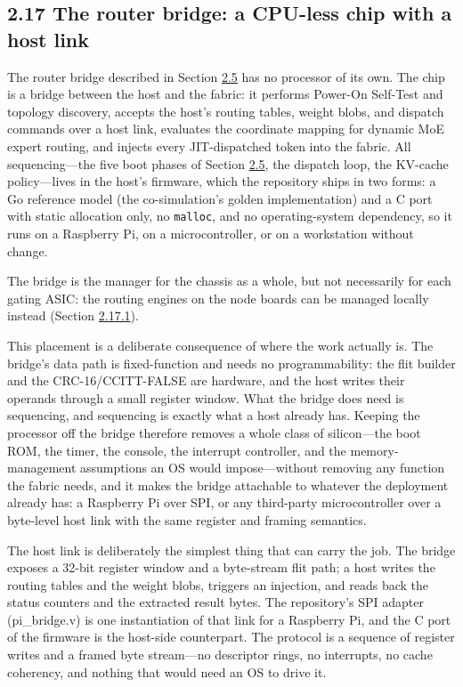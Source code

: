 \documentclass[10pt,twocolumn]{article}
\begin{document}
\subsection*{2.17 The router bridge: a CPU-less chip with a host link}\label{sec:2.17}

The router bridge described in Section \hyperref[sec:2.5]{2.5} has no processor of its own. The chip is a bridge between the host and the fabric: it performs Power-On Self-Test and topology discovery, accepts the host's routing tables, weight blobs, and dispatch commands over a host link, evaluates the coordinate mapping for dynamic MoE expert routing, and injects every JIT-dispatched token into the fabric. All sequencing---the five boot phases of Section \hyperref[sec:2.5]{2.5}, the dispatch loop, the KV-cache policy---lives in the host's firmware, which the repository ships in two forms: a Go reference model (the co-simulation's golden implementation) and a C port with static allocation only, no \texttt{malloc}, and no operating-system dependency, so it runs on a Raspberry Pi, on a microcontroller, or on a workstation without change.

The bridge is the manager for the chassis as a whole, but not necessarily for each gating ASIC: the routing engines on the node boards can be managed locally instead (Section \hyperref[sec:2.17.1]{2.17.1}).

This placement is a deliberate consequence of where the work actually is. The bridge's data path is fixed-function and needs no programmability: the flit builder and the CRC-16/CCITT-FALSE are hardware, and the host writes their operands through a small register window. What the bridge does need is sequencing, and sequencing is exactly what a host already has. Keeping the processor off the bridge therefore removes a whole class of silicon---the boot ROM, the timer, the console, the interrupt controller, and the memory-management assumptions an OS would impose---without removing any function the fabric needs, and it makes the bridge attachable to whatever the deployment already has: a Raspberry Pi over SPI, or any third-party microcontroller over a byte-level host link with the same register and framing semantics.

The host link is deliberately the simplest thing that can carry the job. The bridge exposes a 32-bit register window and a byte-stream flit path; a host writes the routing tables and the weight blobs, triggers an injection, and reads back the status counters and the extracted result bytes. The repository's SPI adapter (pi\_bridge.v) is one instantiation of that link for a Raspberry Pi, and the C port of the firmware is the host-side counterpart. The protocol is a sequence of register writes and a framed byte stream---no descriptor rings, no interrupts, no cache coherency, and nothing that would need an OS to drive it.
\end{document}
